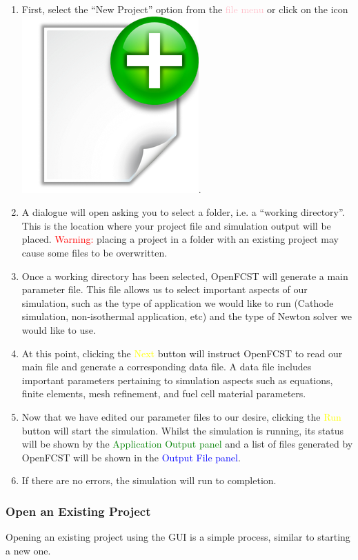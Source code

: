 \begin{enumerate}
 \item First, select the ``New Project'' option from the \textcolor{pink}{file menu} or click on the icon \includegraphics[scale=0.05]{./figures/GUI/new_icon}.
 \item A dialogue will open asking you to select a folder, i.e. a ``working directory''. This is the location  where your project file and simulation output will be placed. \textcolor{red}{Warning:} placing a project in a folder with an existing project may cause some files to be overwritten.
 \item Once a working directory has been selected, OpenFCST will generate a main parameter file. This file allows us to select important aspects of our simulation, such as the type of application we would like to run (Cathode simulation, non-isothermal application, etc) and the type of Newton solver we would like to use.
 \item At this point, clicking the \textcolor{yellow}{Next} button will instruct OpenFCST to read our main file and generate a corresponding data file. A data file includes important parameters pertaining to simulation aspects such as equations,  finite elements,  mesh refinement, and fuel cell material parameters.
 \item Now that we have edited our parameter files to our desire, clicking the \textcolor{yellow}{Run} button will start the simulation. Whilst the simulation is running, its status will be shown by the \textcolor{green}{Application Output panel} and a list of files generated by OpenFCST will be shown in the \textcolor{blue}{Output File panel}.
 \item If there are no errors, the simulation will run to completion.
\end{enumerate}

\subsubsection{Open an Existing Project}\label{sec:open_existing_project_gui}
Opening an existing project using the GUI is a simple process, similar to starting a new one.

